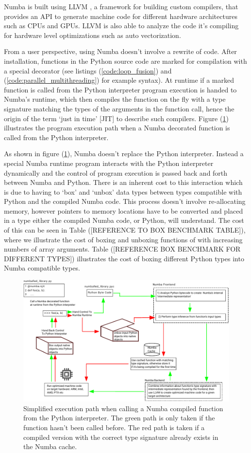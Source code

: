 \documentclass{IEEEcsmag}
\begin{document}
Numba is built using LLVM \cite{Lattner2004}, a framework for building custom compilers, that provides an API to generate machine code for different hardware architectures such as CPUs and GPUs. LLVM is also able to analyze the code it's compiling for hardware level optimizations such as auto vectorization.

From a user perspective, using Numba doesn't involve a rewrite of code. After installation, functions in the Python source code are marked for compilation with a special decorator (see listings (\ref{code:loop_fusion}) and (\ref{code:parallel_multithreading}) for example syntax). At runtime if a marked function is called from the Python interpreter program execution is handed to Numba's runtime, which then compiles the function on the fly with a type signature matching the types of the arguments in the function call, hence the origin of the term `just in time' [JIT] to describe such compilers. Figure (\ref{fig:numba}) illustrates the program execution path when a Numba decorated function is called from the Python interpreter.

As shown in figure (\ref{fig:numba}), Numba doesn't replace the Python interpreter. Instead a special Numba runtime program interacts with the Python interpreter dynamically and the control of program execution is passed back and forth between Numba and Python. There is an inherent cost to this interaction which is due to having to `box' and `unbox' data types between types compatible with Python and the compiled Numba code. This process doesn't involve re-allocating memory, however pointers to memory locations have to be converted and placed in a type either the compiled Numba code, or Python, will understand. The cost of this can be seen in Table ([REFERENCE TO BOX BENCHMARK TABLE]), where we illustrate the cost of boxing and unboxing functions of with increasing numbers of array arguments. Table ([REFERENCE BOX BENCHMARK FOR DIFFERENT TYPES]) illustrates the cost of boxing different Python types into Numba compatible types.

\begin{figure}
    \centerline{\includegraphics {figures/numba.pdf}}
    \caption{Simplified execution path when calling a Numba compiled function from the Python interpreter. The green path is only taken if the function hasn't been called before. The red path is taken if a compiled version with the correct type signature already exists in the Numba cache.}
    \label{fig:numba}
\end{figure}
\end{document}
